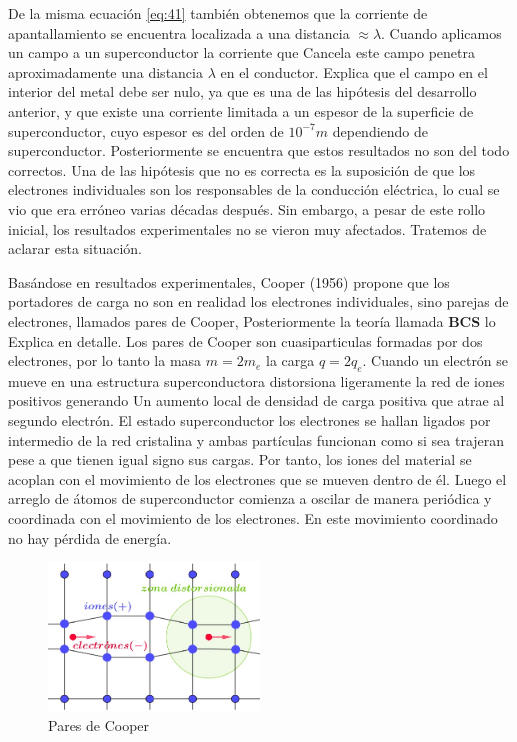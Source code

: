 De la misma ecuación \ref{eq:41} también obtenemos que la corriente de apantallamiento se encuentra localizada a una distancia $\approx \lambda$. Cuando aplicamos un campo a un superconductor la corriente que Cancela este campo penetra aproximadamente una distancia $\lambda$ en el conductor. Explica que el campo en el interior del metal debe ser nulo, ya que es una de las hipótesis del desarrollo anterior, y que existe una corriente limitada a un espesor de la superficie de superconductor, cuyo espesor es del orden de $10^{−7}m$ dependiendo de superconductor. Posteriormente se encuentra que estos resultados no son del todo correctos. Una de las hipótesis que no es correcta es la suposición de que los electrones individuales son los responsables de la conducción eléctrica, lo cual se vio que era erróneo varias décadas después. Sin embargo, a pesar de este rollo inicial, los resultados experimentales no se vieron muy afectados. Tratemos de aclarar esta situación.

Basándose en resultados experimentales, Cooper (1956) propone que los portadores de carga no son en realidad los electrones individuales, sino parejas de electrones, llamados pares de Cooper, Posteriormente la teoría llamada \textbf{BCS} lo Explica en detalle. Los pares de Cooper son cuasiparticulas formadas por dos electrones, por lo tanto la masa $m=2m_{e}$ la carga $q=2q_{e}$. Cuando un electrón se mueve en una estructura superconductora distorsiona ligeramente la red de iones positivos generando Un aumento local de densidad de carga positiva que atrae al segundo electrón. El estado superconductor los electrones se hallan ligados por intermedio de la red cristalina y ambas partículas funcionan como si sea trajeran pese a que tienen igual signo sus cargas. Por tanto, los iones del material se acoplan con el movimiento de los electrones que se mueven dentro de él. Luego el arreglo de átomos de superconductor comienza a oscilar de manera periódica y coordinada con el movimiento de los electrones. En este movimiento coordinado no hay pérdida de energía.

\begin{figure}[H]
    \centering
    \includegraphics[width=0.5\textwidth]{./Figures/fig435}
	\caption{Pares de Cooper}
	\label{fig:435}
\end{figure}

